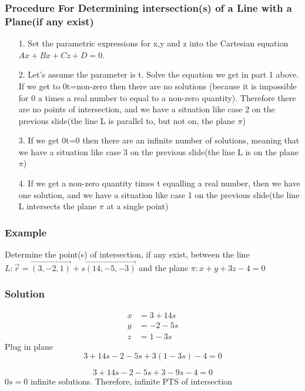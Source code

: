 \documentclass{article}
\begin{document}
\subsubsection{Procedure For Determining intersection(s) of a Line with a Plane(if any exist)}
\begin{tcolorbox}
\begin{enumerate}
    \item[1.] Set the parametric expressions for x,y and z into the Cartesian equation $Ax+Bx+Cz+D=0$.
    \item[2.] Let's assume the parameter is t. Solve the equation we get in part 1 above. If we get to 0t=non-zero then there are no solutions (because it is impossible for 0 a times a real number to equal to a non-zero quantity). Therefore there are no points of intersection, and we have a situation like case 2 on the previous slide(the line L is parallel to, but not on, the plane $\pi$)
    \item[3.] If we get 0t=0 then there are an infinite number of solutions, meaning that we have a situation like case 3 on the previous slide(the line L is on the plane $\pi$)
    \item[4.] If we get a non-zero quantity times t equalling a real number, then we have one solution, and we have a situation like case 1 on the previous slide(the line L intersects the plane $\pi$ at a single point)
\end{enumerate}
\end{tcolorbox}
\subsubsection*{Example}
Determine the point(s) of intersection, if any exist, between the line $L:\vec{r}=\overrightarrow{(3,-2,1)}+s\overrightarrow{(14,-5,-3)}$ and the plane $\pi:x+y+3z-4=0$
\subsubsection*{Solution}
\begin{align*}
    x&=3+14s\\
    y&=-2-5s\\
    z&=1-3s
\end{align*}
Plug in plane
\[
    3+14s-2-5s+3(1-3s)-4=0
\]

\[
    3+14s-2-5s+3-9s-4=0
\]
$0s=0$ infinite solutions. Therefore, infinite PTS of intersection 
\end{document}
